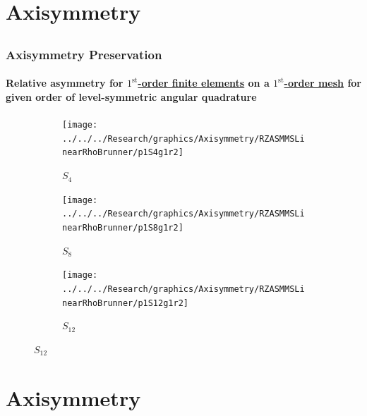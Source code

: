 \documentclass[compress,t]{beamer}
\begin{document}
\section{Axisymmetry}
\subsection{}

\begin{frame}
\frametitle{Axisymmetry Preservation}
\framesubtitle{Relative asymmetry for \underline{$1^\text{st}$-order finite elements} on a \underline{$1^\text{st}$-order mesh} for given order of level-symmetric angular quadrature}

\begin{figure}
\centering
\begin{subfigure}{0.33\textwidth}
\centering
\texttt{[image: ../../../Research/graphics/Axisymmetry/RZASMMSLinearRhoBrunner/p1S4g1r2]}
\caption{$S_4$}
\end{subfigure}%
\begin{subfigure}{0.33\textwidth}
\centering
\texttt{[image: ../../../Research/graphics/Axisymmetry/RZASMMSLinearRhoBrunner/p1S8g1r2]}
\caption{$S_8$}
\end{subfigure}%
\begin{subfigure}{0.33\textwidth}
\centering
\texttt{[image: ../../../Research/graphics/Axisymmetry/RZASMMSLinearRhoBrunner/p1S12g1r2]}
\caption{$S_{12}$}
\end{subfigure}
\end{figure}

\end{frame}

\section{Axisymmetry}
\subsection{}
\end{document}
